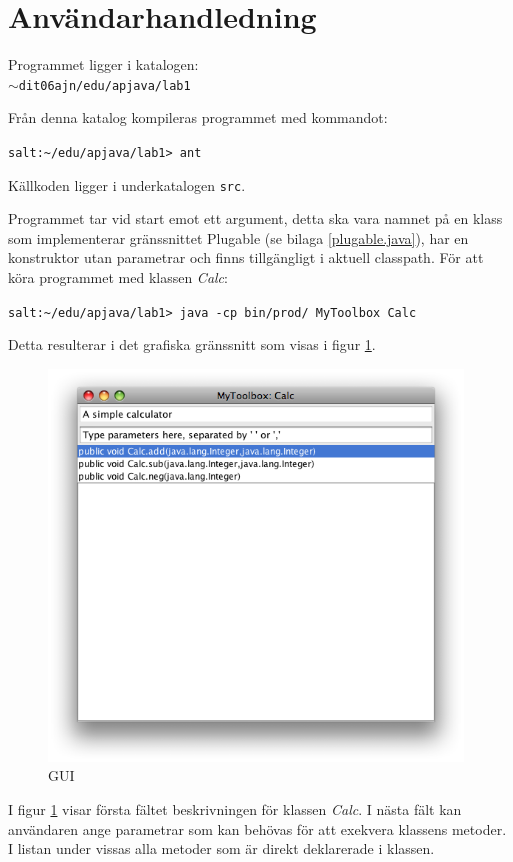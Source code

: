 \documentclass[a4paper, 12pt]{article}
\def\pathtocode{$\sim$dit06ajn/edu/apjava/lab1}
\begin{document}
\section{Användarhandledning}
Programmet ligger i katalogen:\\
\texttt{\pathtocode}

Från denna katalog kompileras programmet med kommandot:

\verb!salt:~/edu/apjava/lab1> ant!

Källkoden ligger i underkatalogen \verb!src!.

Programmet tar vid start emot ett argument, detta ska vara namnet på
en klass som implementerar gränssnittet Plugable (se bilaga
\ref{plugable.java}), har en konstruktor utan parametrar och finns
tillgängligt i aktuell classpath. För att köra programmet med klassen
\textit{Calc}:

\verb!salt:~/edu/apjava/lab1> java -cp bin/prod/ MyToolbox Calc!

Detta resulterar i det grafiska gränssnitt som visas i figur
\ref{fig:gui}.

\begin{figure}[H]
  \begin{center}
    \includegraphics[width=110mm]{images/gui-out.png}
    \caption{GUI}
    \label{fig:gui}
  \end{center}
\end{figure}

I figur \ref{fig:gui} visar första fältet beskrivningen för klassen
\textit{Calc}. I nästa fält kan användaren ange parametrar som kan
behövas för att exekvera klassens metoder. I listan under vissas alla
metoder som är direkt deklarerade i klassen.
\end{document}
